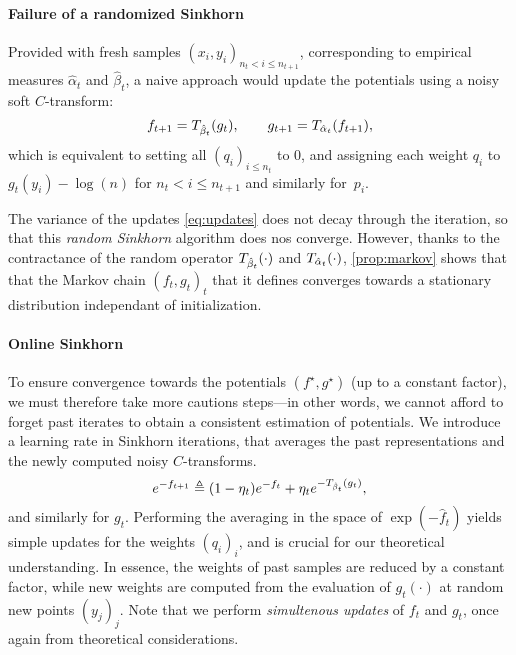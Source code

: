 \paragraph{Failure of a randomized Sinkhorn}

Provided with fresh samples $(x_i, y_i)_{n_t < i \leq n_{t+1}}$, 
corresponding to empirical measures $\hat \alpha_t$ and $\hat \beta_t$, a naive approach would 
 update the potentials using a noisy soft $C$-transform:
\begin{equation}\label{eq:updates}
     f_{t+1} = \Ctrans{g_t}{\hat \beta_t},
    \qquad g_{t+1} = \Ctrans{f_{t+1}}{\hat \alpha_t},
\end{equation}
which is equivalent to setting all $(q_i)_{i \leq n_t}$ to $0$, and assigning each weight
 $q_i$ to $g_t(y_i) - \log(n)$ for $n_t < i \leq  n_{t+1}$ and similarly for~$p_i$.

The variance of the updates \eqref{eq:updates} does not decay through the iteration, so that this
\textit{random Sinkhorn} algorithm does nos converge. However, thanks to the contractance of the random operator $\Ctrans{\cdot}{\hat \beta_t}$ and $\Ctrans{\cdot}{\hat \alpha_t}$, \autoref{prop:markov} shows that that the Markov chain ${(f_t,
g_t)}_t$ that it defines converges towards a stationary distribution independant
of initialization.

\paragraph{Online Sinkhorn}

To ensure convergence towards the potentials $(f^\star, g^\star)$ (up to a
constant factor), we must therefore take more cautions steps---in other words,
we cannot afford to forget past iterates to obtain a consistent estimation of
potentials. We introduce a learning rate in Sinkhorn iterations, that averages
the past representations and the newly computed noisy $C$-transforms.
\begin{equation}\label{eq:updates}
    e^{-f_{t+1}}
    \eqdef (1 - \eta_t) e^{-f_t} 
    + \eta_t 
    e^{-\Ctrans{g_t}{\hat \beta_t}},
\end{equation}
and similarly for $g_t$. Performing the averaging in the space of
$\exp(-\hat f_{t})$ yields simple updates for the weights
${(q_i)}_i$, and is crucial for our theoretical understanding. In essence, the
weights of past samples are reduced by a constant factor, while new weights are
computed from the evaluation of $g_t(\cdot)$ at random new points ${(y_j)}_j$. Note that we
perform \textit{simultenous updates} of $f_t$ and $g_t$, once again from
theoretical considerations.

